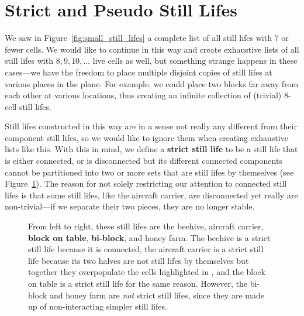 \section{Strict and Pseudo Still Lifes}\label{sec:pseudo_strict_still_lifes}

We saw in Figure~\ref{fig:small_still_lifes} a complete list of all still lifes with $7$ or fewer cells. We would like to continue in this way and create exhaustive lists of all still lifes with $8, 9, 10, \ldots$ live cells as well, but something strange happens in these cases---we have the freedom to place multiple disjoint copies of still lifes at various places in the plane. For example, we could place two blocks far away from each other at various locations, thus creating an infinite collection of (trivial) $8$-cell still lifes.

Still lifes constructed in this way are in a sense not really any different from their component still lifes, so we would like to ignore them when creating exhaustive lists like this. With this in mind, we define a \textbf{strict still life} to be a still life that is either connected, or is disconnected but its different connected components cannot be partitioned into two or more sets that are still lifes by themselves (see Figure~\ref{fig:strict_non_strict}). The reason for not solely restricting our attention to connected still lifes is that some still lifes, like the aircraft carrier, are disconnected yet really are non-trivial---if we separate their two pieces, they are no longer stable.

\begin{figure}[!htb]
	\centering{}
	\caption{From left to right, these still lifes are the beehive, aircraft carrier, \textbf{block on table}, \textbf{bi-block}, and honey farm. The beehive is a strict still life because it is connected, the aircraft carrier is a strict still life because its two halves are not still lifes by themselves but together they overpopulate the cells highlighted in , and the block on table is a strict still life for the same reason. However, the bi-block and honey farm are \emph{not} strict still lifes, since they are made up of non-interacting simpler still lifes.}\label{fig:strict_non_strict}
\end{figure}

